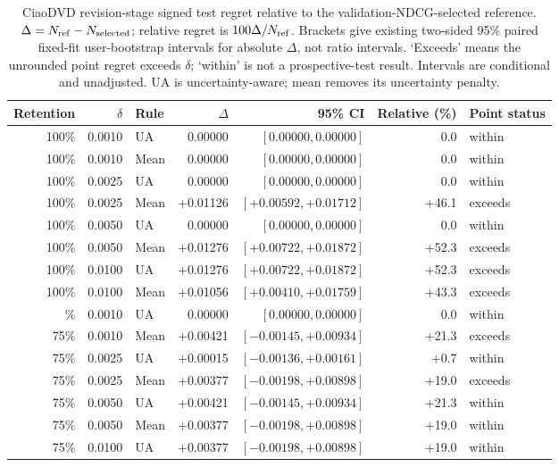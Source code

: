\begin{table}[H]
\centering
\caption{CiaoDVD revision-stage signed test regret relative to the validation-NDCG-selected reference. $\Delta=N_{\rm ref}-N_{\rm selected}$; relative regret is $100\Delta/N_{\rm ref}$. Brackets give existing two-sided 95\% paired fixed-fit user-bootstrap intervals for absolute $\Delta$, not ratio intervals. `Exceeds' means the unrounded point regret exceeds $\delta$; `within' is not a prospective-test result. Intervals are conditional and unadjusted. UA is uncertainty-aware; mean removes its uncertainty penalty.}
\label{tab:coverage-regret-ciaodvd}
\small
\setlength{\tabcolsep}{4pt}
\begin{tabular}{@{}rrlrrrl@{}}
\toprule
Retention & $\delta$ & Rule & $\Delta$ & 95\% CI & Relative (\%) & Point status \\
\midrule
100\% & 0.0010 & UA & 0.00000 & $[0.00000, 0.00000]$ & 0.0 & within \\
100\% & 0.0010 & Mean & 0.00000 & $[0.00000, 0.00000]$ & 0.0 & within \\
100\% & 0.0025 & UA & 0.00000 & $[0.00000, 0.00000]$ & 0.0 & within \\
100\% & 0.0025 & Mean & +0.01126 & $[+0.00592, +0.01712]$ & +46.1 & exceeds \\
100\% & 0.0050 & UA & 0.00000 & $[0.00000, 0.00000]$ & 0.0 & within \\
100\% & 0.0050 & Mean & +0.01276 & $[+0.00722, +0.01872]$ & +52.3 & exceeds \\
100\% & 0.0100 & UA & +0.01276 & $[+0.00722, +0.01872]$ & +52.3 & exceeds \\
100\% & 0.0100 & Mean & +0.01056 & $[+0.00410, +0.01759]$ & +43.3 & exceeds \\
\addlinespace
75\% & 0.0010 & UA & 0.00000 & $[0.00000, 0.00000]$ & 0.0 & within \\
75\% & 0.0010 & Mean & +0.00421 & $[-0.00145, +0.00934]$ & +21.3 & exceeds \\
75\% & 0.0025 & UA & +0.00015 & $[-0.00136, +0.00161]$ & +0.7 & within \\
75\% & 0.0025 & Mean & +0.00377 & $[-0.00198, +0.00898]$ & +19.0 & exceeds \\
75\% & 0.0050 & UA & +0.00421 & $[-0.00145, +0.00934]$ & +21.3 & within \\
75\% & 0.0050 & Mean & +0.00377 & $[-0.00198, +0.00898]$ & +19.0 & within \\
75\% & 0.0100 & UA & +0.00377 & $[-0.00198, +0.00898]$ & +19.0 & within \\

\end{tabular}
\end{table}

